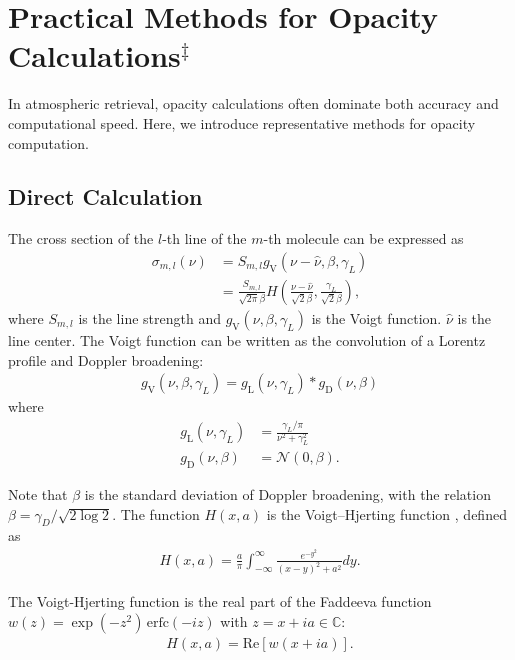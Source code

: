 \section{Practical Methods for Opacity Calculations$^\ddagger$}

In atmospheric retrieval, opacity calculations often dominate both accuracy and computational speed.  
Here, we introduce representative methods for opacity computation.

\subsection*{Direct Calculation}

The cross section of the $l$-th line of the $m$-th molecule can be expressed as
\begin{align}
  \sigma_{m,l}(\nu) &= S_{m,l} g_\mathrm{V}(\nu - \hat{\nu} , \beta, \gamma_L) \\
  &= \frac{S_{m,l}}{\sqrt{2 \pi} \beta} H\left( \frac{\nu -\hat{\nu}}{\sqrt{2} \beta},\frac{\gamma_L}{\sqrt{2} \beta} \right),
\end{align}
where $S_{m,l}$ is the line strength and $g_\mathrm{V}(\nu, \beta, \gamma_L)$ is the Voigt function.  
$\hat{\nu}$ is the line center. The Voigt function can be written as the convolution of a Lorentz profile and Doppler broadening:
\begin{align}
g_\mathrm{V}(\nu, \beta, \gamma_L) = g_\mathrm{L} (\nu,\gamma_L) \ast g_\mathrm{D} (\nu,\beta) 
\end{align}
where
\begin{align}
 g_\mathrm{L} (\nu,\gamma_L) &= \frac{\gamma_L/\pi}{\nu^2 + \gamma_L^2} \\
 g_\mathrm{D} (\nu,\beta) &= \mathcal{N} (0, \beta).
\end{align}

Note that $\beta$ is the standard deviation of Doppler broadening, with the relation $\beta = \gamma_D/\sqrt{2 \log{2}}$.  
The function $H(x,a)$ is the Voigt--Hjerting function \cite{1938ApJ....88..508H}, defined as
\begin{align}
H(x,a) = \frac{a}{\pi} \int_{-\infty}^{\infty} \frac{e^{-y^2}}{(x-y)^2 + a^2} dy.
\end{align}

The Voigt-Hjerting function is the real part of the Faddeeva function 
$w(z) = \exp{(-z^2)} \, \mathrm{erfc}(-i z)$ with $z = x + i a \in \mathbb{C}$:
\begin{align}
H(x,a) = \mathrm{Re}[w(x +i a)].
\end{align}

